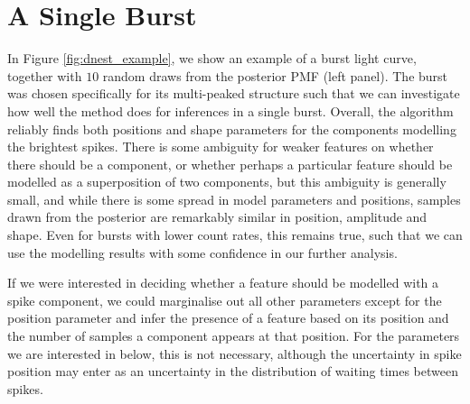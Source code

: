 \documentclass[12pt]{emulateapj}
\newcommand{\project}[1]{\textsl{#1}}
\newcommand{\given}{\,|\,}
\newcommand{\Uniform}{{\mathcal U}}
\newcommand{\bg}{\mathrm{bg}}
\begin{document}




\section{A Single Burst}
\label{sec:oneburst}
In Figure \ref{fig:dnest_example}, we show an example of a burst light curve, together with $10$ random draws from the posterior PMF (left panel).
The burst was chosen specifically for its multi-peaked structure such that we can investigate how well the method does for
inferences in a single burst. Overall, the algorithm reliably finds both positions and shape parameters for the components modelling
the brightest spikes. There is some ambiguity for weaker features on whether there should be a component, or whether perhaps a
particular feature should be modelled as a superposition of two components, but this ambiguity is generally small, and while there is some
spread in model parameters and positions, samples drawn from the posterior are remarkably similar in position, amplitude and shape. 
Even for bursts with lower count rates, this remains true, such that we can use the modelling results with some confidence in our further analysis.

If we were interested in deciding whether a feature should be modelled with a spike component, we could marginalise out all other parameters
except for the position parameter and infer the presence of a feature based on its position and the number of samples a component appears at
that position. For the parameters we are interested in below, this is not necessary, although the uncertainty in spike position may enter as an 
uncertainty in the distribution of waiting times between spikes.
\end{document}
